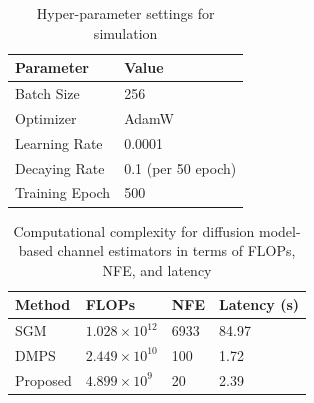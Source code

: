 \documentclass[lettersize,journal]{IEEEtran}
\begin{document}
\begin{table}[!t]
\begin{center}
  \renewcommand{\arraystretch}{1.1} 
\caption{Hyper-parameter settings for simulation\label{tab:table1}}
\label{tab1}
\begin{tabular}{M{0.19\columnwidth}|M{0.3\columnwidth}}
\hline
\textbf{Parameter} & \textbf{Value} \\
\hline
Batch Size & 256 \\
\hline
Optimizer & AdamW \\
\hline
Learning Rate & 0.0001 \\
\hline
Decaying Rate & 0.1 (per 50 epoch) \\
\hline
Training Epoch & 500 \\
\hline
\end{tabular}
\end{center}
\end{table}

\begin{table}[!t]
\centering
\renewcommand{\arraystretch}{1.1} 
\caption{Computational complexity for diffusion model-based channel estimators in terms of FLOPs, NFE, and latency}
\label{tab:table2}
\begin{tabular}{M{0.20\columnwidth}|M{0.21\columnwidth}|M{0.20\columnwidth}|M{0.20\columnwidth}}
\hline
\textbf{Method} & \textbf{FLOPs} & \textbf{NFE} & \textbf{Latency (s)} \\
\hline
SGM\cite{arvinteMIMOChannelEstimation2023} & \(1.028 \times 10^{12}\) & 6933 & 84.97 \\
\hline
DMPS\cite{zhouGenerativeDiffusionModels2025} & \(2.449 \times 10^{10}\) & 100 & 1.72 \\
\hline
Proposed & \(4.899 \times 10^9\) & 20 & 2.39 \\
\hline
\end{tabular}
\end{table}
\end{document}
